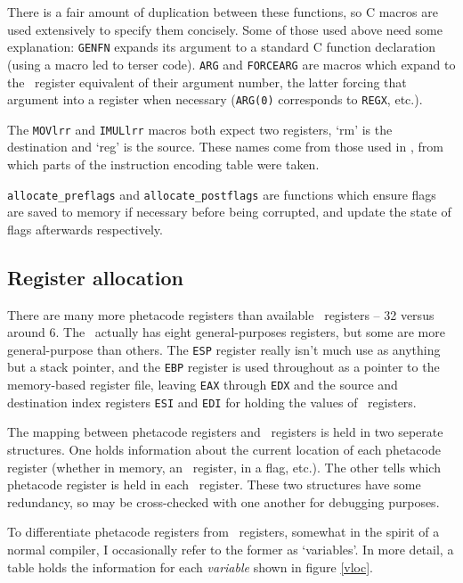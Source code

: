There is a fair amount of duplication between these functions, so C macros are used extensively to specify them concisely. Some of those used above need some explanation: {\tt GENFN} expands its argument to a standard C function declaration (using a macro led to terser code). {\tt ARG} and {\tt FORCEARG} are macros which expand to the \ia\ register equivalent of their argument number, the latter forcing that argument into a register when necessary ({\tt ARG(0)} corresponds to {\tt REGX}, etc.).

The {\tt MOVlrr} and {\tt IMULlrr} macros both expect two registers, `rm' is the destination and `reg' is the source. These names come from those used in \cite{ArtOfAsm9X}, from which parts of the instruction encoding table were taken.

{\tt allocate\_preflags} and {\tt allocate\_postflags} are functions which ensure flags are saved to memory if necessary before being corrupted, and update the state of flags afterwards respectively.

\subsection{Register allocation}

There are many more phetacode registers than available \ia\ registers -- 32 versus around 6. The \ia\ actually has eight general-purposes registers, but some are more general-purpose than others. The {\tt ESP} register really isn't much use as anything but a stack pointer, and the {\tt EBP} register is used throughout as a pointer to the memory-based register file, leaving {\tt EAX} through {\tt EDX} and the source and destination index registers {\tt ESI} and {\tt EDI} for holding the values of \arm\ registers.

The mapping between phetacode registers and \ia\ registers is held in two seperate structures. One holds information about the current location of each phetacode register (whether in memory, an \ia\ register, in a flag, etc.). The other tells which phetacode register is held in each \ia\ register. These two structures have some redundancy, so may be cross-checked with one another for debugging purposes.

To differentiate phetacode registers from \ia\ registers, somewhat in the spirit of a normal compiler, I occasionally refer to the former as `variables'. In more detail, a table holds the information for each {\it variable} shown in figure \ref{vloc}.

